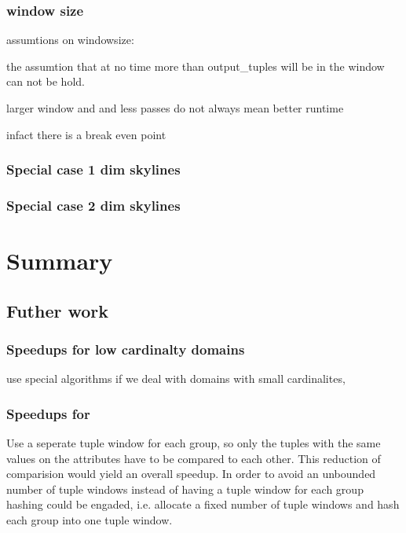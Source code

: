\subsection{window size}
assumtions on windowsize:

the assumtion that at no time more than output\_tuples will be in the
window can not be hold.

larger window and and less passes do not always mean better runtime

infact there is a break even point

\subsection{Special case 1 dim skylines}


\subsection{Special case 2 dim skylines}


\chapter{Summary}

\section{Futher work}

\subsection{Speedups for low cardinalty domains}
%
use special algorithms if we deal with domains with small
cardinalites, \citep{Preisinger2006, Preisinger2007, Morse2007}

\subsection{Speedups for }
%
Use a seperate tuple window for each 
group, so only the tuples with the same values on the
 attributes have to be compared to each
other. This reduction of comparision would yield an overall speedup.
In order to avoid an unbounded number of tuple windows instead of
having a tuple window for each  group
hashing could be engaded, i.e. allocate a fixed number of tuple
windows and hash each  group into one tuple
window.

